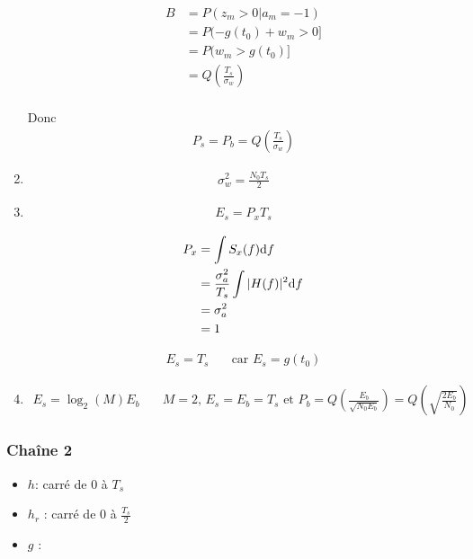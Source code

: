 \documentclass{article}
\begin{document}
\begin{enumerate}
    \begin{align*}
        B &= P(z_m > 0 | a_m = -1) \\
          &= P(-g(t_0) + w_m > 0 ] \\
          &= P(w_m > g(t_0)]  \\
          &= Q\left( \frac{T_s}{\sigma_w} \right)  \\
    \end{align*}

    Donc \begin{align*}
        P_s = P_b = Q\left( \frac{T_s}{\sigma_w} \right) 
    \end{align*}

\item 
    \begin{align*}
        \sigma_w^2 = \frac{N_0 T_s}{2}
    \end{align*}

    \item \begin{align*}
        E_s = P_x T_s
    \end{align*}

    \begin{align*}
        P_x &= \int S_x(f) \mathrm{d}f \\
        &= \frac{\sigma_a^2}{T_s} \int |H(f)|^2 \mathrm{d}f \\
        &= \sigma_a^2 \\
        &= 1 \\
    \end{align*}

    \begin{align*}
        E_s = T_s \quad&\text{car $E_s = g(t_0)$}
    \end{align*}

\item 
    \begin{align*}
        E_s = \log_2(M) E_b \quad&\text{$M=2$, $E_s = E_b = T_s$ et $P_b = Q\left( \frac{E_b}{\sqrt{N_0 E_b} } \right) = Q\left( \sqrt{\frac{2 E_b}{N_0}}  \right)  $}
    \end{align*}

\end{enumerate}

\subsubsection{Chaîne 2}

\begin{itemize}
    \item $h$: carré de 0 à $T_s$
    \item $h_r$ : carré de 0 à $\frac{T_s}{2}$
    \item $g$ : 
\end{itemize}
\end{document}
